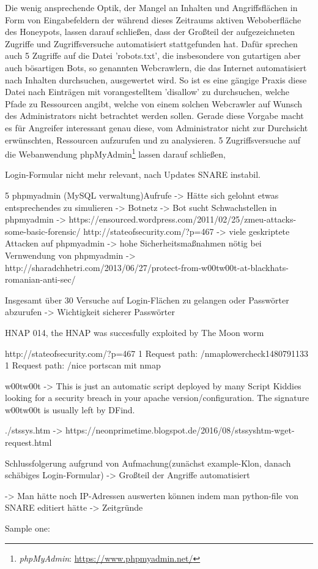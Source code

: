 Die wenig ansprechende Optik, der Mangel an Inhalten und Angriffsflächen in Form von Eingabefeldern der während dieses Zeitraums aktiven Weboberfläche des Honeypots, lassen darauf schließen, dass der Großteil der aufgezeichneten Zugriffe und Zugriffsversuche automatisiert stattgefunden hat. Dafür sprechen auch 5 Zugriffe auf die Datei 'robots.txt', die insbesondere von gutartigen aber auch bösartigen Bots, so genannten Webcrawlern, die das Internet automatisiert nach Inhalten durchsuchen, ausgewertet wird. So ist es eine gängige Praxis diese Datei nach Einträgen mit vorangestelltem 'disallow' zu durchsuchen, welche Pfade zu Ressourcen angibt, welche von einem solchen Webcrawler auf Wunsch des Administrators nicht betrachtet werden sollen. Gerade diese Vorgabe macht es für Angreifer interessant genau diese, vom Administrator nicht zur Durchsicht erwünschten, Ressourcen aufzurufen und zu analysieren. 5 Zugriffsversuche auf die Webanwendung phpMyAdmin\footnote{ \textit{phpMyAdmin}: \url{https://www.phpmyadmin.net/}} lassen darauf schließen, 


Login-Formular nicht mehr relevant, nach Updates SNARE instabil.


5 phpmyadmin (MySQL verwaltung)Aufrufe -> Hätte sich gelohnt etwas entsprechendes zu simulieren
-> Botnetz
-> Bot sucht Schwachstellen in phpmyadmin -> https://ensourced.wordpress.com/2011/02/25/zmeu-attacks-some-basic-forensic/
http://stateofsecurity.com/?p=467
-> viele geskriptete Attacken auf phpmyadmin -> hohe Sicherheitsmaßnahmen nötig bei Vernwendung von phpmyadmin
-> http://sharadchhetri.com/2013/06/27/protect-from-w00tw00t-at-blackhats-romanian-anti-sec/

Insgesamt über 30 Versuche auf Login-Flächen zu gelangen oder Passwörter abzurufen -> Wichtigkeit sicherer Passwörter

HNAP  014, the HNAP was succesfully exploited by The Moon worm

http://stateofsecurity.com/?p=467 
   1 Request path: /nmaplowercheck1480791133
   1 Request path: /nice%
   portscan mit nmap

w00tw00t -> This is just an automatic script deployed by many Script Kiddies looking for a security breach in your apache version/configuration. The signature w00tw00t is usually left by DFind.

./stssys.htm -> https://neonprimetime.blogspot.de/2016/08/stssyshtm-wget-request.html

Schlussfolgerung aufgrund von Aufmachung(zunächst example-Klon, danach schäbiges Login-Formular) -> Großteil der Angriffe automatisiert

-> Man hätte noch IP-Adressen auswerten können indem man python-file von SNARE editiert hätte -> Zeitgründe


Sample one:
